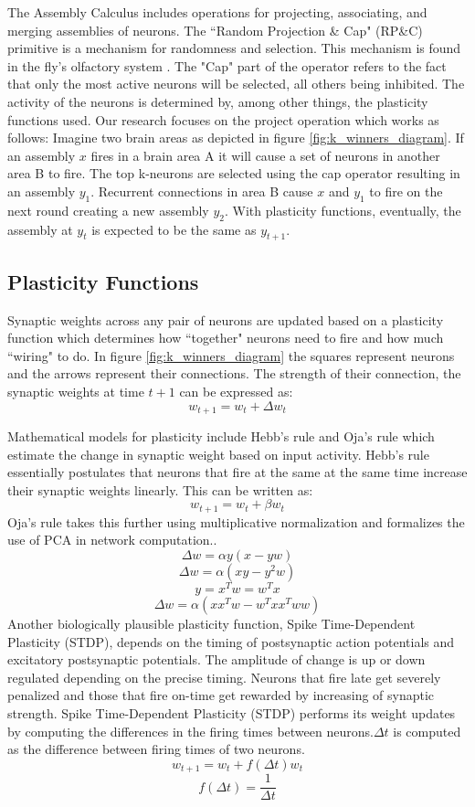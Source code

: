 \documentclass{article}
\begin{document}
The Assembly Calculus includes operations for projecting, associating, and merging assemblies of neurons.  The ``Random Projection \& Cap" (RP\&C) primitive is a mechanism for randomness and selection. This mechanism is found in the fly's olfactory system \cite{fly}. The "Cap" part of the operator refers to the fact that only the most active neurons will be selected, all others being inhibited. The activity of the neurons is determined by, among other things, the plasticity functions used.
Our research focuses on the project operation which works as follows: 
Imagine two brain areas as depicted in figure \ref{fig:k_winners_diagram}. If an assembly $x$ fires in a brain area A it will cause a set of neurons in another area B to fire. The top k-neurons are selected using the cap operator resulting in an assembly $y_1$. Recurrent connections in area B cause $x$ and $y_1$ to fire on the next round creating a new assembly $y_2$. With plasticity functions, eventually, the assembly at $y_t$ is expected to be the same as $y_{t+1}$.


\subsection{Plasticity Functions}
Synaptic weights across any pair of neurons are updated based on a plasticity function which determines how ``together" neurons need to fire and how much ``wiring" to do. In figure \ref{fig:k_winners_diagram} the squares represent neurons and the arrows represent their connections. The strength of their connection, the synaptic weights at time $t+1$ can be expressed as:
$$w_{t+1} = w_t + \Delta w_t$$

Mathematical models for plasticity include Hebb’s rule and Oja’s rule which estimate the change in synaptic weight based on input activity. Hebb’s rule essentially postulates that neurons that fire at the same at the same time increase their synaptic weights linearly. This can be written as:
$$w_{t+1} = w_t + \beta w_t$$
Oja’s rule takes this further using multiplicative normalization and formalizes the use of PCA in network computation.\cite{oja-simplified-neuron-model-1982}.
$$ \Delta w = \alpha y (x - y w)$$
$$ \Delta w = \alpha (xy - y^2 w)$$
$$ y = x^T w = w^T x$$
$$ \Delta w = \alpha (x x^T w - w^T x x^T w w)$$
Another biologically plausible plasticity function, Spike Time-Dependent Plasticity (STDP), depends on the timing of postsynaptic action potentials and excitatory postsynaptic potentials. The amplitude of change is up or down regulated depending on the precise timing. Neurons that fire late get severely penalized and those that fire on-time get rewarded by increasing of synaptic strength. 
Spike Time-Dependent Plasticity (STDP) performs its weight updates by computing the differences in the firing times between neurons.$\Delta t$ is computed as the difference between firing times of two neurons.
$$ w_{t+1} = w_t + f(\Delta t) w_t$$
$$ f(\Delta t) = \frac{1}{\Delta t}$$
\end{document}
